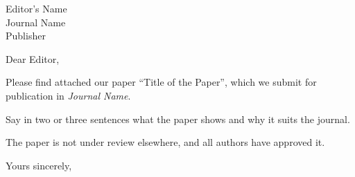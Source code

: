\documentclass[paper=a4,fromalign=right,fromphone,fromemail]{scrlttr2}
\begin{document}
\begin{letter}{Editor's Name\\Journal Name\\Publisher}
\opening{Dear Editor,}

Please find attached our paper ``Title of the Paper'', which we submit for
publication in \emph{Journal Name}.

Say in two or three sentences what the paper shows and why it suits the journal.

The paper is not under review elsewhere, and all authors have approved it.

\closing{Yours sincerely,}
\end{letter}
\end{document}
